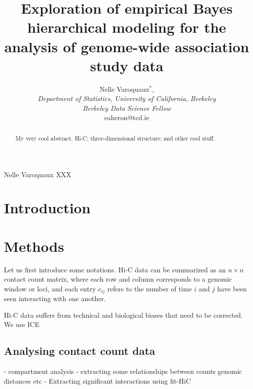 \documentclass[oupdraft]{bio}
\begin{document}
\title{Exploration of empirical Bayes hierarchical modeling for the
analysis of genome-wide association study data}

\author{Nelle Varoquaux$^\ast$,\\[4pt]
\textit{Department of Statistics, University of California, Berkeley \\
Berkeley Data Science Fellow}
\\[2pt]
{eaheron@tcd.ie}}

\markboth%
{Nelle Varoquaux}
{XXX}

\maketitle


\begin{abstract}
{My very cool abstract.}
{Hi-C; three-dimensional structure; and other cool stuff.
}
\end{abstract}


\section{Introduction}
\label{sec1}


\section{Methods}
\label{sec2}

Let us first introduce some notations. Hi-C data can be summarized as an $n
\times n$ contact count matrix, where each row and column corresponds to a
genomic window or loci, and each entry $c_{ij}$ refers to the number of time
$i$ and $j$ have been seen interacting with one another.

Hi-C data suffers from technical and biological biases that need to be
corrected. We use ICE


\subsection{Analysing contact count data}
- compartment analysis
- extracting some relationships between counts genomic distances etc
- Extracting significant interactions using fit-HiC
\end{document}
